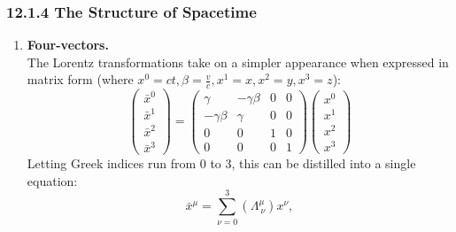 \documentclass[12pt]{book}
\begin{document}
\subsubsection{12.1.4 The Structure of Spacetime}
    \begin{enumerate}
        \item \textbf{Four-vectors.} \\
            The Lorentz transformations take on a simpler appearance when expressed in matrix form (where $x^0=ct, \beta = \frac{v}{c}, x^1=x, x^2=y, x^3=z$): 
            \[
            \begin{pmatrix}
            \bar{x}^0 \\
            \bar{x}^1 \\
            \bar{x}^2 \\
            \bar{x}^3
            \end{pmatrix}
            =
            \begin{pmatrix}
            \gamma & -\gamma\beta & 0 & 0 \\
            -\gamma\beta & \gamma & 0 & 0 \\
            0 & 0 & 1 & 0 \\
            0 & 0 & 0 & 1
            \end{pmatrix}
            \begin{pmatrix}
            x^0 \\
            x^1 \\
            x^2 \\
            x^3
            \end{pmatrix}
            \]   
            Letting Greek indices run from 0 to 3, this can be distilled into a single equation:
            \[
            \bar{x}^\mu = \sum_{\nu=0}^{3} (\Lambda^\mu_{\ \nu}) x^\nu,
            \]
        

\end{enumerate}
\end{document}
